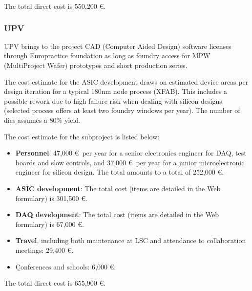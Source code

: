 The total direct cost is 550,200 \euro.

\subsubsection{UPV}
UPV brings to the project CAD (Computer Aided Design) software licenses through Europractice foundation as long as foundry access for MPW (MultiProject Wafer) prototypes and short production series. 

The cost estimate for the ASIC development draws on estimated device areas per design iteration for a typical 180nm node process (XFAB). This includes a possible rework due to high failure risk when dealing with silicon designs (selected process offers at least two foundry windows per year). The number of dies assumes a 80\% yield. 

The cost estimate for the \sUPV subproject is listed below:
\begin{itemize}[noitemsep,topsep=0pt,parsep=0pt,partopsep=0pt]
    \item {\bf Personnel}: 47,000 \euro\ per year for a senior electronics engineer for DAQ, test boards and slow controls, and 37,000 \euro\ per year for a 
junior microelectronic engineer for silicon design. The total amounts to a total of 252,000 \euro.
\item {\bf ASIC development}: The total cost (items are detailed in the Web formulary) is 301,500 \euro.
\item {\bf DAQ development}: The total cost (items are detailed in the Web formulary) is 67,000 \euro. 
\item {\bf Travel}, including both maintenance at LSC and attendance to collaboration meetings: 29,400 \euro. 
\item {\b Conferences and schools}: 6,000 \euro.
\end{itemize}

The total direct cost is 655,900 \euro.


